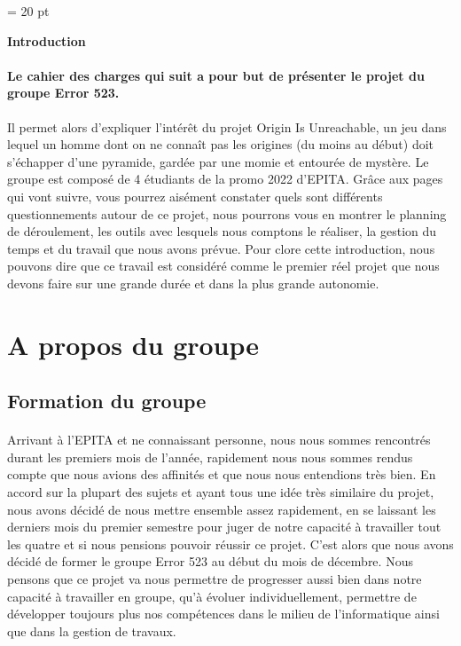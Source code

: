 \documentclass[12pt,a4paper]{article}
\begin{document}
\pagestyle{fancy}
\thispagestyle{empty}
\baselineskip = 20 pt
\newpage
{}

\begin{center}
\begin{Large}
\textbf{Introduction}
\end{Large}
\end{center}

  	\paragraph{		 Le cahier des charges qui suit a pour but de présenter le projet du groupe
Error 523.\newline} 

	Il permet alors d'expliquer l'intérêt du projet Origin Is Unreachable, un jeu dans lequel un homme dont on ne connaît pas les origines (du moins au début) doit s'échapper d'une pyramide, gardée par une
momie et entourée de mystère.
Le groupe est composé de 4 étudiants de la promo 2022 d’EPITA.
Grâce aux pages qui vont suivre, vous pourrez aisément constater quels sont différents questionnements
autour de ce projet, nous pourrons vous en montrer le planning de déroulement, les outils avec lesquels nous comptons le réaliser, la gestion du temps et du travail que nous avons prévue.
Pour clore cette introduction, nous pouvons dire que ce travail est considéré comme le premier réel
projet que nous devons faire sur une grande durée et dans la plus grande autonomie.
\newpage
\thispagestyle{empty}
\tableofcontents

\newpage
\section {A propos du groupe}
\subsection{Formation du groupe}
\paragraph{}
Arrivant à l'EPITA et ne connaissant personne, nous nous sommes rencontrés durant les premiers mois de l'année, rapidement nous nous sommes rendus compte que nous avions des affinités et que nous nous entendions très bien. En accord sur la plupart des sujets et ayant tous une idée très similaire du projet, nous avons décidé de nous mettre ensemble assez rapidement, en se laissant les derniers mois du premier semestre pour juger de notre capacité à travailler tout les quatre et si nous pensions pouvoir réussir ce projet. C'est alors que nous avons décidé de former le groupe Error 523 au début du mois de décembre. Nous pensons que ce projet va nous permettre de progresser aussi bien dans notre capacité à travailler en groupe, qu'à évoluer individuellement, permettre de développer toujours plus nos compétences dans le milieu de l'informatique ainsi que dans la gestion de travaux.
\end{document}
